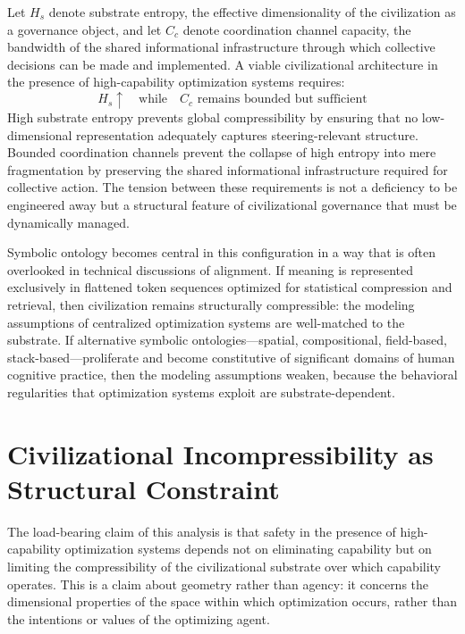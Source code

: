 \documentclass[12pt]{article}
\begin{document}
Let $H_s$ denote substrate entropy, the effective dimensionality of the civilization as a governance object, and let $C_c$ denote coordination channel capacity, the bandwidth of the shared informational infrastructure through which collective decisions can be made and implemented. A viable civilizational architecture in the presence of high-capability optimization systems requires:
\[
H_s \uparrow \quad \text{while} \quad C_c \text{ remains bounded but sufficient}
\]
High substrate entropy prevents global compressibility by ensuring that no low-dimensional representation adequately captures steering-relevant structure. Bounded coordination channels prevent the collapse of high entropy into mere fragmentation by preserving the shared informational infrastructure required for collective action. The tension between these requirements is not a deficiency to be engineered away but a structural feature of civilizational governance that must be dynamically managed.

Symbolic ontology becomes central in this configuration in a way that is often overlooked in technical discussions of alignment. If meaning is represented exclusively in flattened token sequences optimized for statistical compression and retrieval, then civilization remains structurally compressible: the modeling assumptions of centralized optimization systems are well-matched to the substrate. If alternative symbolic ontologies---spatial, compositional, field-based, stack-based---proliferate and become constitutive of significant domains of human cognitive practice, then the modeling assumptions weaken, because the behavioral regularities that optimization systems exploit are substrate-dependent.

\section{Civilizational Incompressibility as Structural Constraint}

The load-bearing claim of this analysis is that safety in the presence of high-capability optimization systems depends not on eliminating capability but on limiting the compressibility of the civilizational substrate over which capability operates. This is a claim about geometry rather than agency: it concerns the dimensional properties of the space within which optimization occurs, rather than the intentions or values of the optimizing agent.
\end{document}
